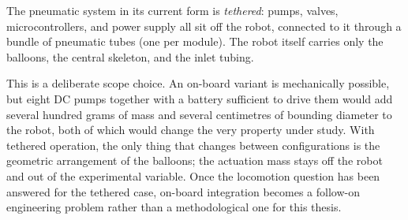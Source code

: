 The pneumatic system in its current form is \textit{tethered}: pumps, valves, microcontrollers, and power supply all sit off the robot, connected to it through a bundle of pneumatic tubes (one per module). The robot itself carries only the balloons, the central skeleton, and the inlet tubing.

This is a deliberate scope choice. An on-board variant is mechanically possible, but eight DC pumps together with a battery sufficient to drive them would add several hundred grams of mass and several centimetres of bounding diameter to the robot, both of which would change the very property under study. With tethered operation, the only thing that changes between configurations is the geometric arrangement of the balloons; the actuation mass stays off the robot and out of the experimental variable. Once the locomotion question has been answered for the tethered case, on-board integration becomes a follow-on engineering problem rather than a methodological one for this thesis.
